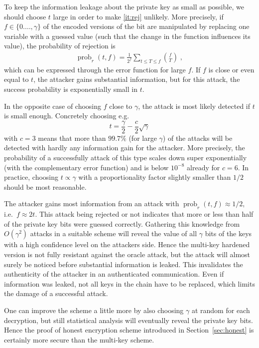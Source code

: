 \documentclass[final,journal,compsoc]{IEEEtran}
\begin{document}
To keep the information leakage about the private key as small as
possible, we should choose $t$ large in order to make \eqref{it:rej}
unlikely. More precisely, if $f\in \{0.\ldots,\gamma\}$ of the
encoded versions of the bit are manipulated by replacing one variable with a
guessed value (such that the change in the function influences
its value), the probability of rejection is
\begin{align}
\operatorname{prob}_r(t,f)= \frac{1}{2^f} \sum_{t\leq T\leq f}\binom{f}{T} \;,
\end{align}
which can be expressed through the error function for large $f$.
If $f$ is close or even equal to $t$, the attacker gains substantial
information, but for this attack, the success probability is
exponentially small in $t$. 

In the opposite case of choosing
$f$ close to $\gamma$, the attack is most likely detected if $t$ is
small enough. Concretely choosing e.g.
\begin{equation}
t = \frac{\gamma}{2} - \frac{c}{2}\sqrt{\gamma}
\end{equation}
with $c=3$ means that more than $99.7\%$ (for large $\gamma$) of the attacks will be
detected with hardly any information gain for the attacker. More
precisely, the probability of a successfully attack of this type
scales down super exponentially (with the complementary error
function) and is below $10^{-8}$ already for $c=6$. In practice,
choosing $t\propto\gamma$ with a proportionality factor slightly
smaller than $1/2$ should be most reasonable. 

The attacker gains most information from an attack with
$\operatorname{prob}_r(t,f)\approx 1/2$, i.e.\ $f \approx 2 t$. This
attack being rejected or not indicates that more or less than half of
the private key bits were guessed correctly. Gathering this knowledge
from $O(\gamma^2)$ attacks in a suitable scheme will reveal the value
of all $\gamma$ bits of the keys with a high confidence level on the
attackers side. Hence the multi-key hardened version is not fully
resistant against the oracle attack, but the attack will almost surely
be noticed before substantial information is leaked. This invalidates
the authenticity of the attacker in an authenticated
communication. Even if information was leaked, not all keys in the
chain have to be replaced, which limits the damage of a successful
attack.  

One can improve the scheme a little more by also choosing
$\gamma$ at random for each decryption, but still statistical analysis
will eventually reveal the private key bits. Hence the proof of honest
encryption scheme
introduced in Section~\ref{sec:honest} is certainly more secure than
the multi-key scheme.
\end{document}
